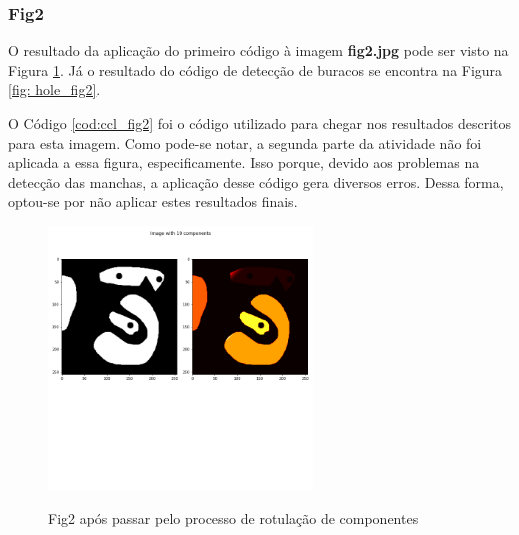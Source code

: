 \documentclass{article}
\begin{document}
\subsubsection{Fig2}
O resultado da aplicação do primeiro código à imagem \textbf{fig2.jpg} pode ser visto na Figura \ref{fig: ccl_fig2}. Já o resultado do código de detecção de buracos se encontra na Figura \ref{fig: hole_fig2}.

O Código \ref{cod:ccl_fig2} foi o código utilizado para chegar nos resultados descritos para esta imagem. Como pode-se notar, a segunda parte da atividade não foi aplicada a essa figura, especificamente. Isso porque, devido aos problemas na detecção das manchas, a aplicação desse código gera diversos erros. Dessa forma, optou-se por não aplicar estes resultados finais.

\begin{figure}[!ht]
	\begin{minipage}[b]{1.0\linewidth}
		\centering
		\centerline{\includegraphics[width=7cm]{Figures/fig2.png}}
		\label{fig: ccl_fig2}
		\vspace{-2.0cm}
		\centerline{Fig2 após passar pelo processo de rotulação de componentes}\medskip	
	\end{minipage}
\end{figure}

\end{document}
